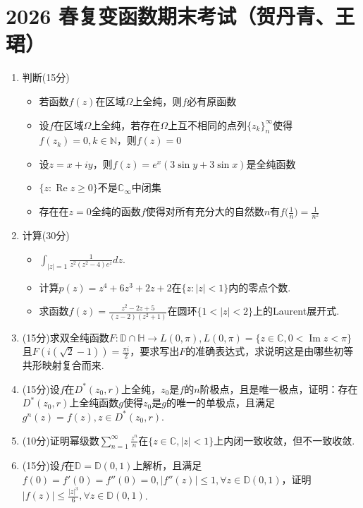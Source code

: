 \section*{2026 春复变函数期末考试（贺丹青、王珺）}
\begin{enumerate}
    \item 判断(15分)\\
    \begin{itemize}
        \item[(1)]若函数$f(z)$在区域$\Omega$上全纯，则$f$必有原函数
        \item[(2)]设$f$在区域$\Omega$上全纯，若存在$\Omega$上互不相同的点列$\{z_k\}_n^{\infty}$使得$f(z_k)=0,k\in\mathbb{N}$，则$f(z)=0$
        \item[(3)]设$z=x+iy$，则$f(z)=e^x(3\sin y+3\sin x)$是全纯函数
        \item[(4)]$\{z:\operatorname{Re} z\geqslant0\}$不是$\mathbb{C}_{\infty}$中闭集
        \item[(5)]存在在$z=0$全纯的函数$f$使得对所有充分大的自然数$n$有$f\big(\frac1n\big)=\frac{1}{n^2}$
    \end{itemize}
    \item 计算(30分)
    \begin{itemize}
        \item[(1)]$\int_{|z|=1}\frac{1}{z^2(z^2-4)e^z}dz$.
        \item[(2)]计算$p(z)=z^4+6z^3+2z+2$在$\{z:|z|<1\}$内的零点个数.
        \item[(3)]求函数$f(z)=\frac{z^2-2z+5}{(z-2)(z^2+1)}$在圆环$\{1<|z|<2\}$上的Laurent展开式.
    \end{itemize}
    \item (15分)求双全纯函数$F:\mathbb{D}\cap\mathbb{H}\to L(0,\pi),L(0,\pi)=\{z\in\mathbb{C},0<\operatorname{Im} z<\pi\}$且$F(i(\sqrt2-1))=\frac{\pi i}{2}$，要求写出$F$的准确表达式，求说明这是由哪些初等共形映射复合而来.
    \item (15分)设$f$在$D^*(z_0,r)$上全纯，$z_0$是$f$的$n$阶极点，且是唯一极点，证明：存在$D^*(z_0,r)$上全纯函数$g$使得$z_0$是$g$的唯一的单极点，且满足$g^n(z)=f(z),z\in D^*(z_0,r)$.
    \item (10分)证明幂级数$\sum_{n=1}^{\infty}\frac{z^n}{n}$在$\{z\in\mathbb{C},|z|<1\}$上内闭一致收敛，但不一致收敛.
    \item (15分)设$f$在$\mathbb{D}=\mathbb{D}(0,1)$上解析，且满足$f(0)=f'(0)=f''(0)=0,|f''(z)|\leqslant 1,\forall z\in \mathbb{D}(0,1)$，证明$|f(z)|\leqslant\frac{|z|^3}{6},\forall z\in\mathbb{D}(0,1)$.
\end{enumerate}
